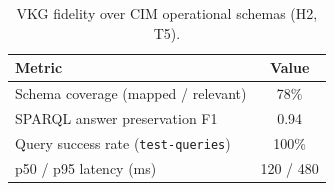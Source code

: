 \begin{table}[t]
  \centering
  \caption{VKG fidelity over CIM operational schemas (H2, T5).}
  \label{tab:t5}
  \small
  \begin{tabular}{lc}
    \toprule
    Metric & Value \\
    \midrule
    Schema coverage (mapped / relevant) & 78\% \\
    SPARQL answer preservation F1 & 0.94 \\
    Query success rate (\texttt{test-queries}) & 100\% \\
    p50 / p95 latency (ms) & 120 / 480 \\
    \bottomrule
  \end{tabular}
\end{table}
